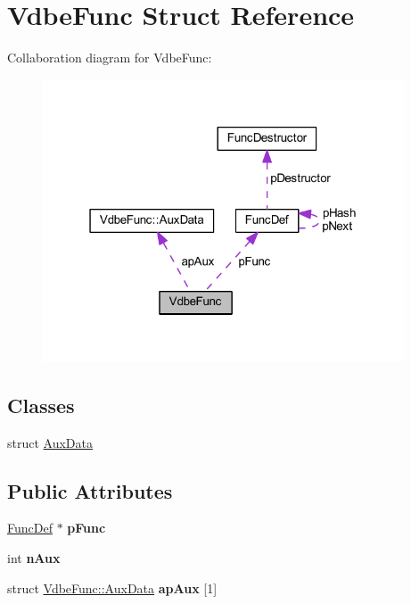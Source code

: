 \hypertarget{struct_vdbe_func}{\section{Vdbe\-Func Struct Reference}
\label{struct_vdbe_func}
}


Collaboration diagram for Vdbe\-Func\-:\nopagebreak
\begin{figure}[H]
\begin{center}
\leavevmode
\includegraphics[width=304pt]{struct_vdbe_func__coll__graph}
\end{center}
\end{figure}
\subsection*{Classes}
\begin{DoxyCompactItemize}
\item 
struct \hyperlink{struct_vdbe_func_1_1_aux_data}{Aux\-Data}
\end{DoxyCompactItemize}
\subsection*{Public Attributes}
\begin{DoxyCompactItemize}
\item 
\hypertarget{struct_vdbe_func_a73cbc96029bec2f37c7e2a79052a2f65}{\hyperlink{struct_func_def}{Func\-Def} $\ast$ {\bfseries p\-Func}}\label{struct_vdbe_func_a73cbc96029bec2f37c7e2a79052a2f65}

\item 
\hypertarget{struct_vdbe_func_ad78feda4c310ea0bc17b7bba53bccd3c}{int {\bfseries n\-Aux}}\label{struct_vdbe_func_ad78feda4c310ea0bc17b7bba53bccd3c}

\item 
\hypertarget{struct_vdbe_func_abb466d61a0d36b913418460e5922166a}{struct \hyperlink{struct_vdbe_func_1_1_aux_data}{Vdbe\-Func\-::\-Aux\-Data} {\bfseries ap\-Aux} \mbox{[}1\mbox{]}}\label{struct_vdbe_func_abb466d61a0d36b913418460e5922166a}

\end{DoxyCompactItemize}


